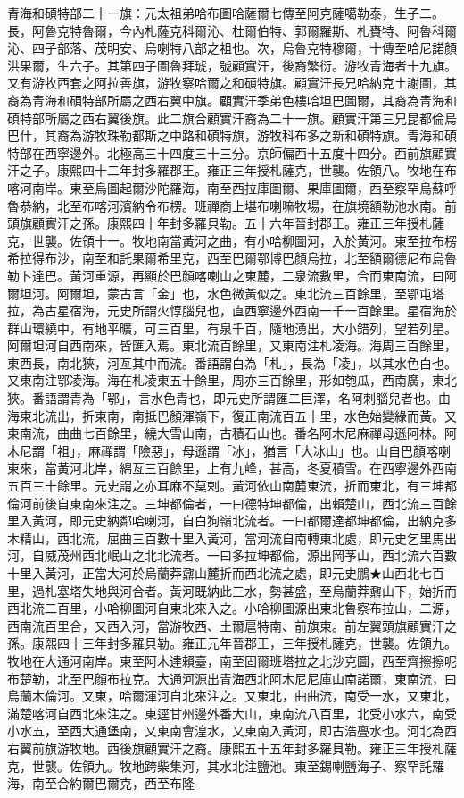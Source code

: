 \begin{pinyinscope}
青海和碩特部二十一旗：元太祖弟哈布圖哈薩爾七傳至阿克薩噶勒泰，生子二。長，阿魯克特魯爾，今內札薩克科爾沁、杜爾伯特、郭爾羅斯、札賚特、阿魯科爾沁、四子部落、茂明安、烏喇特八部之祖也。次，烏魯克特穆爾，十傳至哈尼諾顏洪果爾，生六子。其第四子圖魯拜琥，號顧實汗，後裔繁衍。游牧青海者十九旗。又有游牧西套之阿拉善旗，游牧察哈爾之和碩特旗。顧實汗長兄哈納克土謝圖，其裔為青海和碩特部所屬之西右翼中旗。顧實汗季弟色樓哈坦巴圖爾，其裔為青海和碩特部所屬之西右翼後旗。此二旗合顧實汗裔為二十一旗。顧實汗第三兄昆都倫烏巴什，其裔為游牧珠勒都斯之中路和碩特旗，游牧科布多之新和碩特旗。青海和碩特部在西寧邊外。北極高三十四度三十三分。京師偏西十五度十四分。西前旗顧實汗之子。康熙四十二年封多羅郡王。雍正三年授札薩克，世襲。佐領八。牧地在布喀河南岸。東至烏圖起爾沙陀羅海，南至西拉庫圖爾、果庫圖爾，西至察罕烏蘇呼魯恭納，北至布喀河濱納令布楞。班禪商上堪布喇嘛牧場，在旗境額勒池水南。前頭旗顧實汗之孫。康熙四十年封多羅貝勒。五十六年晉封郡王。雍正三年授札薩克，世襲。佐領十一。牧地南當黃河之曲，有小哈柳圖河，入於黃河。東至拉布楞希拉得布沙，南至和託果爾希里克，西至巴爾鄂博巴顏烏拉，北至額爾德尼布烏魯勒卜達巴。黃河重源，再顯於巴顏喀喇山之東麓，二泉流數里，合而東南流，曰阿爾坦河。阿爾坦，蒙古言「金」也，水色微黃似之。東北流三百餘里，至鄂屯塔拉，為古星宿海，元史所謂火惇腦兒也，直西寧邊外西南一千一百餘里。星宿海於群山環繞中，有地平曠，可三百里，有泉千百，隨地湧出，大小錯列，望若列星。阿爾坦河自西南來，皆匯入焉。東北流百餘里，又東南注札凌海。海周三百餘里，東西長，南北狹，河亙其中而流。番語謂白為「札」，長為「凌」，以其水色白也。又東南注鄂凌海。海在札凌東五十餘里，周亦三百餘里，形如匏瓜，西南廣，東北狹。番語謂青為「鄂」，言水色青也，即元史所謂匯二巨澤，名阿剌腦兒者也。由海東北流出，折東南，南抵巴顏渾嶺下，復正南流百五十里，水色始變綠而黃。又東南流，曲曲七百餘里，繞大雪山南，古積石山也。番名阿木尼麻禪母遜阿林。阿木尼謂「祖」，麻禪謂「險惡」，母遜謂「冰」，猶言「大冰山」也。山自巴顏喀喇東來，當黃河北岸，綿亙三百餘里，上有九峰，甚高，冬夏積雪。在西寧邊外西南五百三十餘里。元史謂之亦耳麻不莫剌。黃河依山南麓東流，折而東北，有三坤都倫河前後自東南來注之。三坤都倫者，一曰德特坤都倫，出賴楚山，西北流三百餘里入黃河，即元史納鄰哈喇河，自白狗嶺北流者。一曰都爾達都坤都倫，出納克多木精山，西北流，屈曲三百數十里入黃河，當河流自南轉東北處，即元史乞里馬出河，自威茂州西北岷山之北北流者。一曰多拉坤都倫，源出岡芧山，西北流六百數十里入黃河，正當大河於烏蘭莽鼐山麓折而西北流之處，即元史鵬★山西北七百里，過札塞塔失地與河合者。黃河既納此三水，勢甚盛，至烏蘭莽鼐山下，始折而西北流二百里，小哈柳圖河自東北來入之。小哈柳圖源出東北魯察布拉山，二源，西南流百里合，又西入河，當游牧西、土爾扈特南、前旗東。前左翼頭旗顧實汗之孫。康熙四十三年封多羅貝勒。雍正元年晉郡王，三年授札薩克，世襲。佐領九。牧地在大通河南岸。東至阿木達賴臺，南至固爾班塔拉之北沙克圖，西至齊擦擦呢布楚勒，北至巴顏布拉克。大通河源出青海西北阿木尼尼庫山南諾爾，東南流，曰烏蘭木倫河。又東，哈爾渾河自北來注之。又東北，曲曲流，南受一水，又東北，滿楚喀河自西北來注之。東逕甘州邊外番大山，東南流八百里，北受小水六，南受小水五，至西大通堡南，又東南會湟水，又東南入黃河，即古浩亹水也。河北為西右翼前旗游牧地。西後旗顧實汗之裔。康熙五十五年封多羅貝勒。雍正三年授札薩克，世襲。佐領九。牧地跨柴集河，其水北注鹽池。東至錫喇鹽海子、察罕託羅海，南至合約爾巴爾克，西至布隆
\end{pinyinscope}
